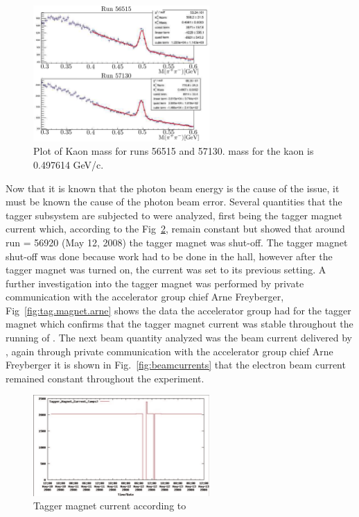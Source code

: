 \begin{figure}\begin{center}
\includegraphics[width=0.6\textwidth]{figures/calib/tag/ecor/Kaon_mass.eps}
\caption[Kaon Mass for Run 56515 and 57130]{\label{fig:beamcor.k_mass}Plot of Kaon mass for runs 56515 and 57130.   mass for the kaon is 0.497614 GeV/c.}
\end{center}\end{figure}

\FloatBarrier

Now that it is known that the photon beam energy is the cause of the issue, it must be known the cause of the photon beam error. Several quantities that the tagger subsystem are subjected to were analyzed, first being the tagger magnet current which, according to the  Fig~\ref{fig:tag.magnet.epics}, remain constant
but showed that around run = 56920 (May 12, 2008) the tagger magnet was shut-off. The tagger magnet shut-off was done because work had to be done in the hall, however after the tagger magnet was turned on, the current was set to its previous setting. A further investigation into the tagger magnet was performed by private communication with the accelerator group chief Arne Freyberger, Fig~\ref{fig:tag.magnet.arne} shows the data the accelerator group had for the tagger magnet which confirms that the tagger magnet current was stable throughout the running of . The next beam quantity analyzed was the beam current delivered by , again through private communication with the accelerator group chief Arne Freyberger it is shown in Fig.~\ref{fig:beamcurrents} that the electron beam current remained constant throughout the  experiment.
\begin{figure}\begin{center}
\includegraphics[width=0.6\textwidth]{figures/calib/tag/ecor/600px-Hystersis_smokingGun.pdf}
\caption[Current of Tagger Magnet from ]{\label{fig:tag.magnet.epics}Tagger magnet current according to }
\end{center}\end{figure}


